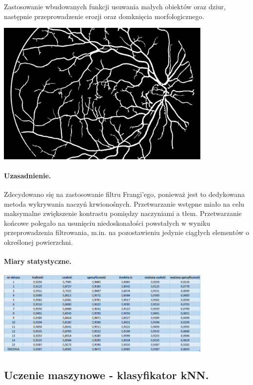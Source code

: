 \documentclass[a4paper, 11pt]{article}
\begin{document}
Zastosowanie wbudowanych funkcji usuwania małych obiektów oraz dziur, następnie przeprowadzenie erozji oraz domknięcia morfologicznego.
\begin{center}
	\includegraphics[width=0.8\textwidth]{./processing/deblobed_image.png}
\end{center}
\paragraph{Uzasadnienie.}

Zdecydowano się na zastosowanie filtru Frangi'ego, ponieważ jest to dedykowana metoda wykrywania naczyń krwionośnych. Przetwarzanie wstępne miało na celu maksymalne zwiększenie kontrastu pomiędzy naczyniami a tłem. Przetwarzanie końcowe polegało na usunięciu niedoskonałości powstałych w wyniku przeprowadzenia filtrowania, m.in. na pozostawieniu jedynie ciągłych elementów o określonej powierzchni.

\paragraph{Miary statystyczne.}
\begin{center}
	\includegraphics[width=0.8\textwidth]{./processing/data.png}
\end{center}

\newpage


\subsection{Uczenie maszynowe - klasyfikator kNN.}
\end{document}
